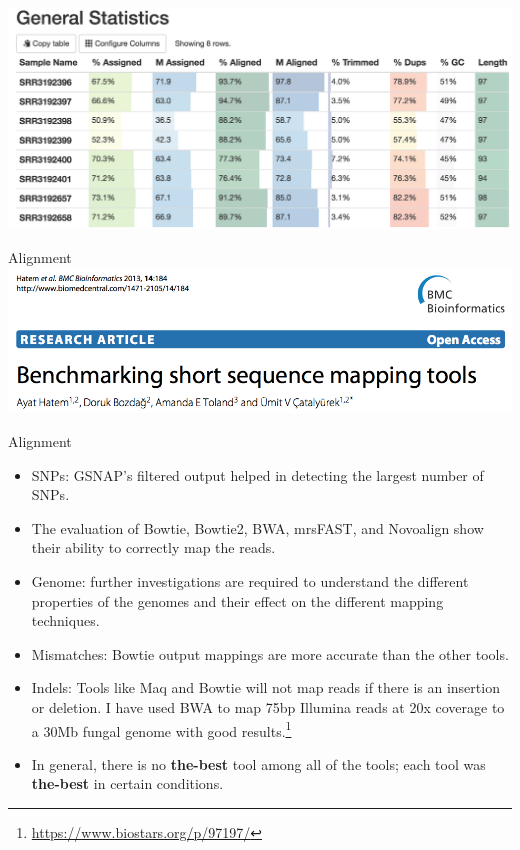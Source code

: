 \documentclass{beamer}
\begin{document}
\begin{frame}
\includegraphics[width=\linewidth]{multiqc.png}
\end{frame}

\begin{frame}{Alignment}
\includegraphics[width=\linewidth]{mappaper.png}
\end{frame}

\begin{frame}{Alignment}
\begin{itemize}
\item SNPs: GSNAP’s filtered output helped in detecting the largest number of SNPs.
\item The evaluation of Bowtie, Bowtie2, BWA, mrsFAST, and Novoalign show their ability to correctly map the reads.
\item Genome: further investigations are required to understand the different properties of the genomes and their effect on the different mapping techniques.
\item Mismatches: Bowtie output mappings are more accurate than the other tools.
\item Indels: Tools like Maq and Bowtie will not map reads if there is an insertion or deletion. I have used BWA to map 75bp Illumina reads at 20x coverage to a 30Mb fungal genome with good results.\footnote{\url{https://www.biostars.org/p/97197/}}
\item In general, there is no \textbf{the-best} tool among all of the tools; each tool was \textbf{the-best} in certain conditions.
\end{itemize}
\end{frame}
\end{document}
